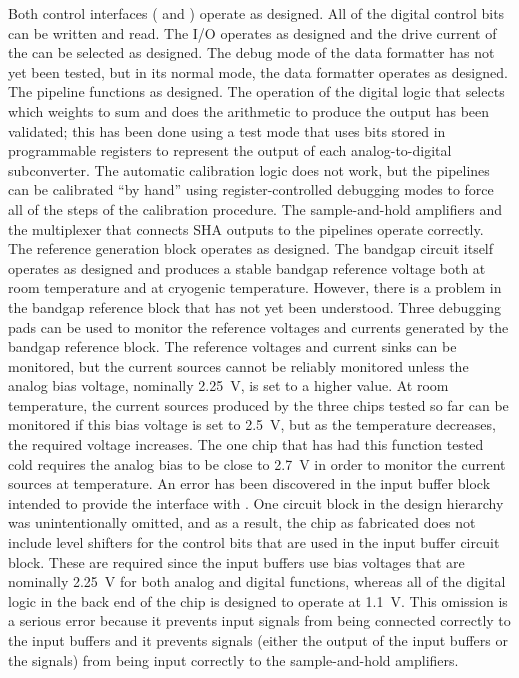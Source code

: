Both control interfaces ( and ) operate as designed.  All of the digital control
bits can be written and read.  The  I/O operates as designed and the drive current of the
 can be selected as designed.  The debug mode of the data formatter has not yet been tested,
but in its normal mode, the data formatter operates as designed.  The  pipeline functions as
designed.  The operation of the digital logic that selects which weights to sum and does the arithmetic
to produce the  output has been validated; this has been done using a test mode that uses bits
stored in programmable registers to represent the output of each analog-to-digital subconverter.  The automatic
calibration logic does not work, but the pipelines can be calibrated ``by hand'' using register-controlled
debugging modes to force all of the steps of the calibration procedure.  The sample-and-hold amplifiers and the
multiplexer that connects SHA outputs to the  pipelines operate correctly.  The 
reference generation block operates as designed.  The bandgap circuit itself operates as designed and produces
a stable bandgap reference voltage both at room temperature and at cryogenic temperature.  However, there is a
problem in the bandgap reference block that has not yet been understood.  Three debugging pads can be used to
monitor the reference voltages and currents generated by the bandgap reference block.  The reference voltages
and current sinks can be monitored, but the current sources cannot be reliably monitored unless the analog bias
voltage, nominally \SI{2.25}{V}, is set to a higher value.  At room temperature, the current sources produced
by the three chips tested so far can be monitored if this bias voltage is set to \SI{2.5}{V}, but as the
temperature decreases, the required voltage increases.  The one chip that has had this function tested cold
requires the analog bias to be close to \SI{2.7}{V} in order to monitor the current sources at \lntwo
temperature.  An error has been discovered in the input buffer block intended to provide the interface with
.  One circuit block in the design hierarchy was unintentionally omitted, and as a result, the
chip as fabricated does not include level shifters for the control bits that are used in the input buffer
circuit block.  These are required since the input buffers use bias voltages that are nominally \SI{2.25}{V}
for both analog and digital functions, whereas all of the digital logic in the back end of the chip is designed
to operate at \SI{1.1}{V}.  This omission is a serious error because it prevents input signals from being
connected correctly to the input buffers and it prevents signals (either the output of the input buffers or
the  signals) from being input correctly to the sample-and-hold amplifiers.

